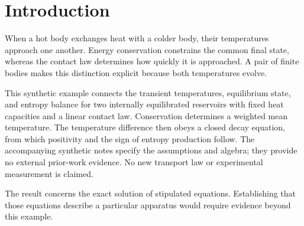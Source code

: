 \section{Introduction}
When a hot body exchanges heat with a colder body, their temperatures approach one another. Energy conservation constrains the common final state, whereas the contact law determines how quickly it is approached. A pair of finite bodies makes this distinction explicit because both temperatures evolve.

This synthetic example connects the transient temperatures, equilibrium state, and entropy balance for two internally equilibrated reservoirs with fixed heat capacities and a linear contact law. Conservation determines a weighted mean temperature. The temperature difference then obeys a closed decay equation, from which positivity and the sign of entropy production follow. The accompanying synthetic notes specify the assumptions and algebra; they provide no external prior-work evidence. No new transport law or experimental measurement is claimed.

The result concerns the exact solution of stipulated equations. Establishing that those equations describe a particular apparatus would require evidence beyond this example.
